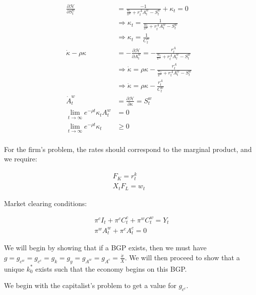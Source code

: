 \begin{align}
    \frac{\partial \mathcal{H}}{\partial S_t^w} &= \frac{-1}{\frac{w_t}{\pi^w} + r_t^A A_t^w - S_t^w} + \kappa_t = 0 \\
    &\Rightarrow \kappa_t = \frac{1}{\frac{w_t}{\pi^w} + r_t^A A_t^w - S_t^w} \\
    &\Rightarrow \kappa_t = \frac{1}{C_t^w} \label{eq:pset_2023_24_ps2_q1_golosov_w_foc1} \\
    \dot{\kappa} - \rho \kappa &= - \frac{\partial \mathcal{H}}{\partial A_t^w} 
    = -\frac{r_t^A}{\frac{w_t}{\pi^w} + r_t^A A_t^w - S_t^w} \\
    &\Rightarrow \dot{\kappa} = \rho \kappa - \frac{r_t^A}{\frac{w_t}{\pi^w} + r_t^A A_t^w - S_t^w} \\
    &\Rightarrow \dot{\kappa} = \rho \kappa - \frac{r_t^A}{C_t^w} \label{eq:pset_2023_24_ps2_q1_golosov_w_foc2} \\
    \dot{A}_t^w &= \frac{\partial \mathcal{H}}{\partial \kappa} = S_t^w \label{eq:pset_2023_24_ps2_q1_golosov_w_foc3} \\
    \underset{t \rightarrow \infty}{\lim} e^{-\rho t} \kappa_t A_t^w &= 0 \\
    \underset{t \rightarrow \infty}{\lim} e^{-\rho t} \kappa_t &\geq 0 \\
\end{align}

For the firm's problem, the rates should correspond to the marginal product, and we require:

\begin{align}
    F_K = r_t^k \\
    X_t F_L = w_t
\end{align}

Market clearing conditions:

\begin{align}
    & \pi^c I_t+\pi^c C_t^c+\pi^w C_t^w=Y_t \\
    & \pi^w A_t^w+\pi^c A_t^c=0
\end{align}


We will begin by showing that if a BGP exists,
then we must have \\
$g = g_{c^w} = g_{c^c} = g_{k} = g_{y} = g_{A^w} = g_{A^c} = \frac{\dot{x}}{X}$.
We will then proceed to show that a unique $k^*_0$ exists such that 
the economy begins on this BGP.

We begin with the capitalist's problem to get a value for $g_{c^c}$.

